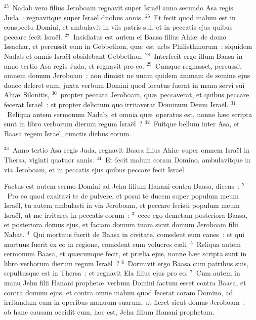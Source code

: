 ${}^{25}$~Nadab vero filius Jeroboam regnavit super Isra\"el anno secundo Asa regis Juda~: regnavitque super Isra\"el duobus annis.
${}^{26}$~Et fecit quod malum est in conspectu Domini, et ambulavit in viis patris sui, et in peccatis ejus quibus peccare fecit Isra\"el.
${}^{27}$~Insidiatus est autem ei Baasa filius Ahi\ae\ de domo Issachar, et percussit eum in Gebbethon, qu\ae\ est urbs Philisthinorum~: siquidem Nadab et omnis Isra\"el obsidebant Gebbethon.
${}^{28}$~Interfecit ergo illum Baasa in anno tertio Asa regis Juda, et regnavit pro eo.
${}^{29}$~Cumque regnasset, percussit omnem domum Jeroboam~: non dimisit ne unam quidem animam de semine ejus donec deleret eum, juxta verbum Domini quod locutus fuerat in manu servi sui Ahi\ae\ Silonitis,
${}^{30}$~propter peccata Jeroboam, qu\ae\ peccaverat, et quibus peccare fecerat Isra\"el~: et propter delictum quo irritaverat Dominum Deum Isra\"el.
${}^{31}$~Reliqua autem sermonum Nadab, et omnia qu\ae\ operatus est, nonne h\ae c scripta sunt in libro verborum dierum regum Isra\"el~?
${}^{32}$~Fuitque bellum inter Asa, et Baasa regem Isra\"el, cunctis diebus eorum.


${}^{33}$~Anno tertio Asa regis Juda, regnavit Baasa filius Ahi\ae\ super omnem Isra\"el in Thersa, viginti quatuor annis.
${}^{34}$~Et fecit malum coram Domino, ambulavitque in via Jeroboam, et in peccatis ejus quibus peccare fecit Isra\"el.

\lettrine[lines=10,image=true,loversize=0.05,lraise=-0.03]{F}{}actus est autem sermo Domini ad Jehu filium Hanani contra Baasa, dicens~:
${}^{2}$~Pro eo quod exaltavi te de pulvere, et posui te ducem super populum meum Isra\"el, tu autem ambulasti in via Jeroboam, et peccare fecisti populum meum Isra\"el, ut me irritares in peccatis eorum~:
${}^{3}$~ecce ego demetam posteriora Baasa, et posteriora domus ejus, et faciam domum tuam sicut domum Jeroboam filii Nabat.
${}^{4}$~Qui mortuus fuerit de Baasa in civitate, comedent eum canes~: et qui mortuus fuerit ex eo in regione, comedent eum volucres c\ae li.
${}^{5}$~Reliqua autem sermonum Baasa, et qu\ae cumque fecit, et pr\ae lia ejus, nonne h\ae c scripta sunt in libro verborum dierum regum Isra\"el~?
${}^{6}$~Dormivit ergo Baasa cum patribus suis, sepultusque est in Thersa~: et regnavit Ela filius ejus pro eo.
${}^{7}$~Cum autem in manu Jehu filii Hanani prophet\ae\ verbum Domini factum esset contra Baasa, et contra domum ejus, et contra omne malum quod fecerat coram Domino, ad irritandum eum in operibus manuum suarum, ut fieret sicut domus Jeroboam~: ob hanc causam occidit eum, hoc est, Jehu filium Hanani prophetam.



